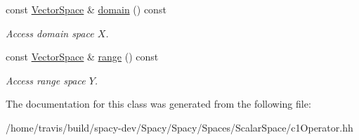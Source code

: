 \begin{DoxyCompactItemize}
\item 
\hypertarget{classSpacy_1_1OperatorBase_a2588f9b3e0188820c4c494e63293dc6f}{const \hyperlink{classSpacy_1_1VectorSpace}{Vector\-Space} \& \hyperlink{classSpacy_1_1OperatorBase_a2588f9b3e0188820c4c494e63293dc6f}{domain} () const }\label{classSpacy_1_1OperatorBase_a2588f9b3e0188820c4c494e63293dc6f}

\begin{DoxyCompactList}\small\item\em Access domain space $X$. \end{DoxyCompactList}\item 
\hypertarget{classSpacy_1_1OperatorBase_ab19d3b7a6f290b1079248f1e567e53d6}{const \hyperlink{classSpacy_1_1VectorSpace}{Vector\-Space} \& \hyperlink{classSpacy_1_1OperatorBase_ab19d3b7a6f290b1079248f1e567e53d6}{range} () const }\label{classSpacy_1_1OperatorBase_ab19d3b7a6f290b1079248f1e567e53d6}

\begin{DoxyCompactList}\small\item\em Access range space $Y$. \end{DoxyCompactList}\end{DoxyCompactItemize}


The documentation for this class was generated from the following file\-:\begin{DoxyCompactItemize}
\item 
/home/travis/build/spacy-\/dev/\-Spacy/\-Spacy/\-Spaces/\-Scalar\-Space/c1\-Operator.\-hh\end{DoxyCompactItemize}
